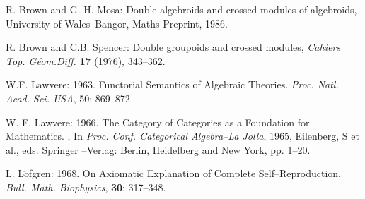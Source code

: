 \documentclass[12pt]{article}
\theoremstyle{plain}
\theoremstyle{definition}
\numberwithin{equation}{section}
\begin{document}
\begin{thebibliography}{99}
R. Brown and G. H. Mosa: Double algebroids and crossed modules of algebroids, University of Wales--Bangor, Maths Preprint, 1986.

R. Brown  and C.B. Spencer: Double groupoids and crossed modules,
\emph{Cahiers Top. G\'eom.Diff.} \textbf{17} (1976), 343--362.

W.F. Lawvere: 1963. Functorial Semantics of Algebraic Theories. \emph{Proc. Natl. Acad. Sci. USA}, 50: 869--872

W. F. Lawvere: 1966. The Category of Categories as a Foundation for Mathematics. , In {\em Proc. Conf. Categorical Algebra--La Jolla}, 1965, Eilenberg, S et al., eds. Springer --Verlag: Berlin, Heidelberg and New York, pp. 1--20.

L. L$\ddot{o}$fgren: 1968. On Axiomatic Explanation of Complete Self--Reproduction. \emph{Bull. Math. Biophysics}, 
\textbf{30}: 317--348. 

\end{thebibliography}
\end{document}
